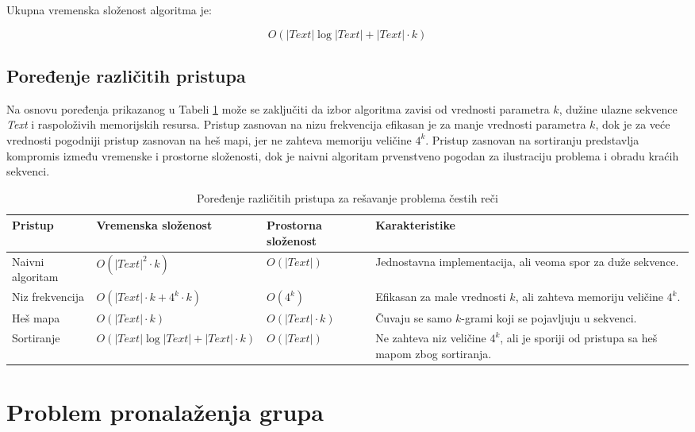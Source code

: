 \documentclass[12pt,oneside]{memoir}
\begin{document}
Ukupna vremenska složenost algoritma je:

\[
O(|Text| \log |Text| + |Text| \cdot k)
\]

\subsection{Poređenje različitih pristupa}


Na osnovu poređenja prikazanog u Tabeli \ref{tab:comparison} može se zaključiti da izbor algoritma zavisi od vrednosti parametra $k$, dužine ulazne sekvence \textit{Text} i raspoloživih memorijskih resursa. Pristup zasnovan na nizu frekvencija efikasan je za manje vrednosti parametra $k$, dok je za veće vrednosti pogodniji pristup zasnovan na heš mapi, jer ne zahteva memoriju veličine $4^k$. Pristup zasnovan na sortiranju predstavlja kompromis između vremenske i prostorne složenosti, dok je naivni algoritam prvenstveno pogodan za ilustraciju problema i obradu kraćih sekvenci.
\begin{table}[H]
\centering
\renewcommand{\arraystretch}{1}
\begin{tabular}{|>{\raggedright\arraybackslash}m{}|>{\centering\arraybackslash}m{}|>{\centering\arraybackslash}m{}|>{\raggedright\arraybackslash}m{}|}
\hline
\textbf{Pristup} & \textbf{Vremenska složenost} & \textbf{Prostorna složenost} & \textbf{Karakteristike} \\
\hline
Naivni algoritam &
$O(|Text|^2 \cdot k)$ &
$O(|Text|)$ &
Jednostavna implementacija, ali veoma spor za duže sekvence. \\
\hline

Niz frekvencija &
$O(|Text|\cdot k + 4^k \cdot k)$ &
$O(4^k)$ &
Efikasan za male vrednosti $k$, ali zahteva memoriju veličine $4^k$. \\
\hline

Heš mapa &
$O(|Text|\cdot k)$ &
$O(|Text|\cdot k)$ &
Čuvaju se samo $k$-grami koji se pojavljuju u sekvenci. \\
\hline

Sortiranje &
$O(|Text|\log|Text| + |Text|\cdot k)$ &
$O(|Text|)$ &
Ne zahteva niz veličine $4^k$, ali je sporiji od pristupa sa heš mapom zbog sortiranja. \\
\hline
\end{tabular}
\caption{Poređenje različitih pristupa za rešavanje problema čestih reči}
\label{tab:comparison}
\end{table}


\section{Problem pronalaženja grupa}
\end{document}
